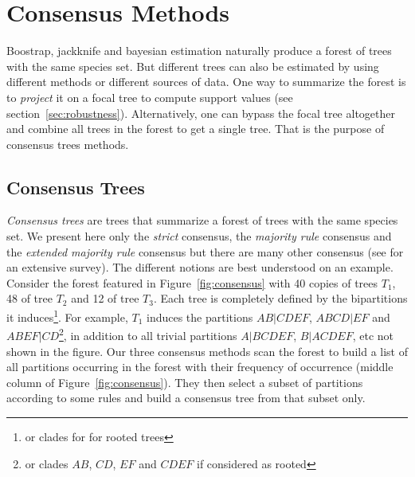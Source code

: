 \section{Consensus Methods} \label{sec:consensus}

Boostrap, jackknife and bayesian estimation naturally produce a forest of trees with the same species set. But different trees can also be estimated by using different methods or different sources of data. One way to summarize the forest is to \emph{project} it on a focal tree to compute support values (see section~\ref{sec:robustness}). Alternatively, one can bypass the focal tree altogether and combine all trees in the forest to get a single tree. That is the purpose of consensus trees methods.

\subsection{Consensus Trees} \label{sec:consensus-tree}


\emph{Consensus trees} are trees that summarize a forest of trees with the same species set. We present here only the \emph{strict} consensus, the \emph{majority rule} consensus and the \emph{extended majority rule} consensus but there are many other consensus (see \citet{Bryant2003} for an extensive survey). The different notions are best understood on an example. Consider the forest featured in Figure~\ref{fig:consensus} with 40 copies of trees $T_1$, 48 of tree $T_2$ and 12 of tree $T_3$. Each tree is completely defined by the bipartitions it induces\footnote{or clades for for rooted trees}. For example, $T_1$ induces the partitions $AB|CDEF$, $ABCD|EF$ and $ABEF|CD$\footnote{or clades $AB$, $CD$, $EF$ and $CDEF$ if considered as rooted}, in addition to all trivial partitions $A|BCDEF$, $B|ACDEF$, etc not shown in the figure. Our three consensus methods scan the forest to build a list of all partitions occurring in the forest with their frequency of occurrence (middle column of Figure~\ref{fig:consensus}). They then select a subset of partitions according to some rules and build a consensus tree from that subset only.

